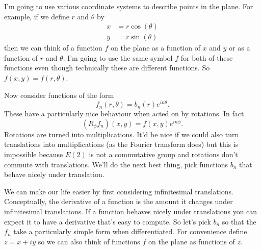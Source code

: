 \documentclass{article}
\begin{document}
I'm going to use various coordinate systems to describe points in the plane.
For example, if we define $r$ and $\theta$ by
\begin{align*}
x & = r\cos(\theta) \\
y & = r\sin(\theta) 
\end{align*}
then we can think of a function $f$ on the plane as a function of $x$ and $y$ or as a function of $r$ and $\theta$.
I'm going to use the same symbol $f$ for both of these functions even though technically these are different functions.
So $f(x,y) = f(r,\theta)$.

Now consider functions of the form
\begin{equation}
f_n(r,\theta)=b_n(r)e^{in\theta}. \label{rot}
\end{equation}
These have a particularly nice behaviour when acted on by rotations.
In fact
\[
(R_\phi f_n)(x,y) = f(x,y)e^{in\phi}.
\]
Rotations are turned into multiplications.
It'd be nice if we could also turn translations into multiplications (as the Fourier transform does) but this is impossible because $E(2)$ is not a commutative group and rotations don't commute with translations.
We'll do the next best thing, pick functions $b_n$ that behave nicely under translation.

We can make our life easier by first considering infinitesimal translations.
Conceptually, the derivative of a function is the amount it changes under infinitesimal translations.
If a function behaves nicely under translations you can expect it to have a derivative that's easy to compute.
So let's pick $b_n$ so that the $f_n$ take a particularly simple form when differentiated.
For convenience define $z=x+iy$ so we can also think of functions $f$ on the plane as functions of $z$.
\end{document}

